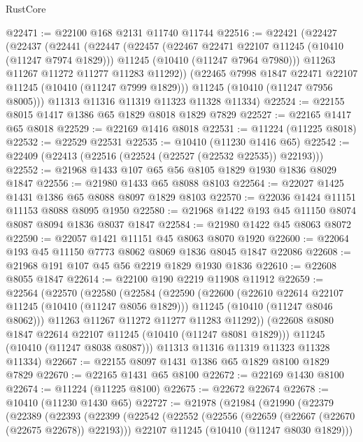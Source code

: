 \begin{lexlean}{RustCore}
\begin{coremodule}
@22471 := @22100 @168 @2131 @11740 @11744
@22516 := @22421
    (@22427
      (@22437
        (@22441
          (@22447
            (@22457
              (@22467 @22471 @22107 @11245 (@10410 (@11247 @7974 @1829)))
              @11245
              (@10410 (@11247 @7964 @7980)))
            @11263
            @11267
            @11272
            @11277
            @11283
            @11292))
        (@22465 @7998 @1847 @22471 @22107 @11245 (@10410 (@11247 @7999 @1829)))
        @11245
        (@10410 (@11247 @7956 @8005)))
      @11313
      @11316
      @11319
      @11323
      @11328
      @11334)
@22524 := @22155 @8015 @1417 @1386 @65 @1829 @8018 @1829 @7829
@22527 := @22165 @1417 @65 @8018
@22529 := @22169 @1416 @8018
@22531 := @11224 (@11225 @8018)
@22532 := @22529 @22531
@22535 := @10410 (@11230 @1416 @65)
@22542 := @22409 (@22413 (@22516 (@22524 (@22527 (@22532 @22535)) @22193)))
@22552 := @21968 @1433 @107 @65 @56 @8105 @1829 @1930 @1836 @8029 @1847
@22556 := @21980 @1433 @65 @8088 @8103
@22564 := @22027 @1425 @1431 @1386 @65 @8088 @8097 @1829 @8103
@22570 := @22036 @1424 @11151 @11153 @8088 @8095 @1950
@22580 := @21968 @1422 @193 @45 @11150 @8074 @8087 @8094 @1836 @8037 @1847
@22584 := @21980 @1422 @45 @8063 @8072
@22590 := @22057 @1421 @11151 @45 @8063 @8070 @1920
@22600 := @22064 @193 @45 @11150 @7773 @8062 @8069 @1836 @8045 @1847 @22086
@22608 := @21968 @191 @107 @45 @56 @2219 @1829 @1930 @1836
@22610 := @22608 @8055 @1847
@22614 := @22100 @190 @2219 @11908 @11912
@22659 := @22564
    (@22570
      (@22580
        (@22584
          (@22590
            (@22600
              (@22610 @22614 @22107 @11245 (@10410 (@11247 @8056 @1829)))
              @11245
              (@10410 (@11247 @8046 @8062)))
            @11263
            @11267
            @11272
            @11277
            @11283
            @11292))
        (@22608 @8080 @1847 @22614 @22107 @11245 (@10410 (@11247 @8081 @1829)))
        @11245
        (@10410 (@11247 @8038 @8087)))
      @11313
      @11316
      @11319
      @11323
      @11328
      @11334)
@22667 := @22155 @8097 @1431 @1386 @65 @1829 @8100 @1829 @7829
@22670 := @22165 @1431 @65 @8100
@22672 := @22169 @1430 @8100
@22674 := @11224 (@11225 @8100)
@22675 := @22672 @22674
@22678 := @10410 (@11230 @1430 @65)
@22727 := @21978
    (@21984
      (@21990
        (@22379
          (@22389
            (@22393
              (@22399
                (@22542
                  (@22552
                    (@22556 (@22659 (@22667 (@22670 (@22675 @22678)) @22193)))
                    @22107
                    @11245
                    (@10410 (@11247 @8030 @1829)))

\end{coremodule}
\end{lexlean}
